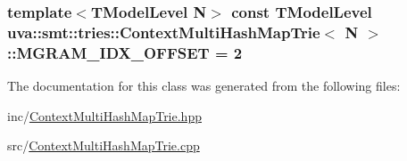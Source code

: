 \subsubsection[{M\+G\+R\+A\+M\+\_\+\+I\+D\+X\+\_\+\+O\+F\+F\+S\+E\+T}]{\setlength{\rightskip}{0pt plus 5cm}template$<$T\+Model\+Level N$>$ const {\bf T\+Model\+Level} {\bf uva\+::smt\+::tries\+::\+Context\+Multi\+Hash\+Map\+Trie}$<$ N $>$\+::M\+G\+R\+A\+M\+\_\+\+I\+D\+X\+\_\+\+O\+F\+F\+S\+E\+T = 2\hspace{0.3cm}{\ttfamily [static]}}\label{classuva_1_1smt_1_1tries_1_1_context_multi_hash_map_trie_ab12bd7cfd0b00da7c134d8d6b1694346}


The documentation for this class was generated from the following files\+:\begin{DoxyCompactItemize}
\item 
inc/\hyperlink{_context_multi_hash_map_trie_8hpp}{Context\+Multi\+Hash\+Map\+Trie.\+hpp}\item 
src/\hyperlink{_context_multi_hash_map_trie_8cpp}{Context\+Multi\+Hash\+Map\+Trie.\+cpp}\end{DoxyCompactItemize}
